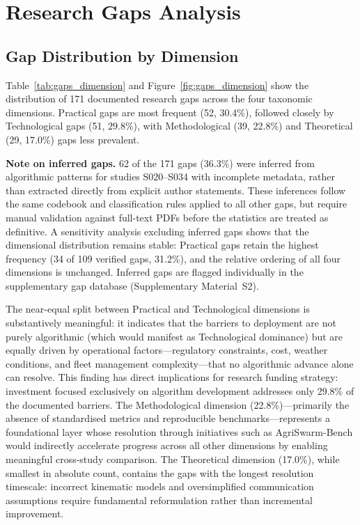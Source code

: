 \documentclass[review,3p,times]{elsarticle}
\begin{document}
\section{Research Gaps Analysis}

\subsection{Gap Distribution by Dimension}

Table~\ref{tab:gaps_dimension} and Figure~\ref{fig:gaps_dimension} show the distribution of 171 documented research gaps across the four taxonomic dimensions. Practical gaps are most frequent (52, 30.4\%), followed closely by Technological gaps (51, 29.8\%), with Methodological (39, 22.8\%) and Theoretical (29, 17.0\%) gaps less prevalent.

\textbf{Note on inferred gaps.} 62 of the 171 gaps (36.3\%) were inferred from algorithmic patterns for studies S020--S034 with incomplete metadata, rather than extracted directly from explicit author statements. These inferences follow the same codebook and classification rules applied to all other gaps, but require manual validation against full-text PDFs before the statistics are treated as definitive. A sensitivity analysis excluding inferred gaps shows that the dimensional distribution remains stable: Practical gaps retain the highest frequency (34 of 109 verified gaps, 31.2\%), and the relative ordering of all four dimensions is unchanged. Inferred gaps are flagged individually in the supplementary gap database (Supplementary Material~S2).

The near-equal split between Practical and Technological dimensions is substantively meaningful: it indicates that the barriers to deployment are not purely algorithmic (which would manifest as Technological dominance) but are equally driven by operational factors---regulatory constraints, cost, weather conditions, and fleet management complexity---that no algorithmic advance alone can resolve. This finding has direct implications for research funding strategy: investment focused exclusively on algorithm development addresses only 29.8\% of the documented barriers. The Methodological dimension (22.8\%)---primarily the absence of standardised metrics and reproducible benchmarks---represents a foundational layer whose resolution through initiatives such as AgriSwarm-Bench would indirectly accelerate progress across all other dimensions by enabling meaningful cross-study comparison. The Theoretical dimension (17.0\%), while smallest in absolute count, contains the gaps with the longest resolution timescale: incorrect kinematic models and oversimplified communication assumptions require fundamental reformulation rather than incremental improvement.
\end{document}
